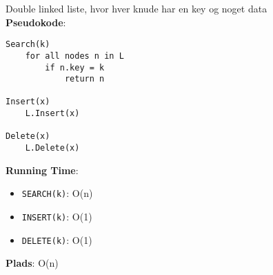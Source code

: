 Double linked liste, hvor hver knude har en key og noget data\\
\textbf{Pseudokode}:
\begin{lstlisting}[frame=single, mathescape=true]
Search(k)
	for all nodes n in L
		if n.key = k
			return n

Insert(x)
	L.Insert(x)

Delete(x)
	L.Delete(x)
\end{lstlisting}
\textbf{Running Time}:
\begin{itemize}
	\item \texttt{SEARCH(k)}: O(n)
	\item \texttt{INSERT(k)}: O(1)
	\item \texttt{DELETE(k)}: O(1)
\end{itemize}
\textbf{Plads}: O(n)